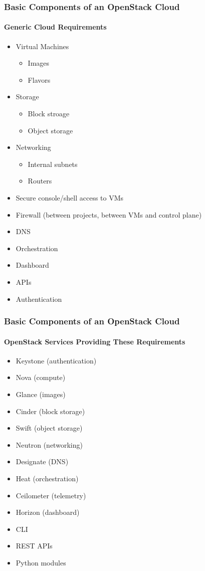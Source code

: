 \documentclass[helvetica,english,utf8,notitle,nologo]{beamer}
\begin{document}
\begin{frame}
  \frametitle{Basic Components of an OpenStack Cloud}
  \framesubtitle{Generic Cloud Requirements}
  \begin{itemize}
  \item Virtual Machines
    \begin{itemize}
    \item Images
    \item Flavors
    \end{itemize}
  \item Storage
    \begin{itemize}
    \item Block stroage
    \item Object storage
    \end{itemize}
  \item Networking
    \begin{itemize}
    \item Internal subnets
    \item Routers
    \end{itemize}
  \item Secure console/shell access to VMs
  \item Firewall (between projects, between VMs and control plane)
  \item DNS
  \item Orchestration
  \item Dashboard
  \item APIs
  \item Authentication
  \end{itemize}
\end{frame}

\begin{frame}
  \frametitle{Basic Components of an OpenStack Cloud}
  \framesubtitle{OpenStack Services Providing These Requirements}
  \begin{itemize}
    \item Keystone (authentication)
    \item Nova (compute)
    \item Glance (images)
    \item Cinder (block storage)
    \item Swift (object storage)
    \item Neutron (networking)
    \item Designate (DNS)
    \item Heat (orchestration)
    \item Ceilometer (telemetry)
    \item Horizon (dashboard)
    \item CLI
    \item REST APIs
    \item Python modules
  \end{itemize}
\end{frame}
\end{document}
